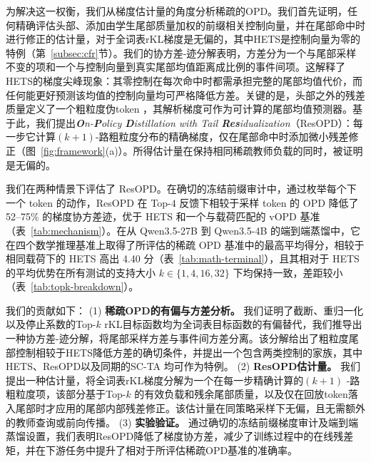 为解决这一权衡，我们从梯度估计量的角度分析稀疏的OPD。我们首先证明，任何精确评估头部、添加由学生尾部质量加权的前缀相关控制向量，并在尾部命中时进行修正的估计量，对于全词表rKL梯度是无偏的，其中HETS是控制向量为零的特例（第~\ref{subsec:cfr}节）。我们的协方差-迹分解表明，方差分为一个与尾部采样不变的项和一个与控制向量到真实尾部均值距离成比例的事件间项。这解释了HETS的梯度尖峰现象：其零控制在每次命中时都需承担完整的尾部均值代价，而任何能更好预测该均值的控制向量均可严格降低方差。关键的是，头部之外的残差质量定义了一个粗粒度伪token \citep{anshumann-etal-2025-sparse,huang2026tail}，其解析梯度可作为可计算的尾部均值预测器。基于此，我们提出\textit{\textbf{O}n-\textbf{P}olicy \textbf{D}istillation with Tail \textbf{Res}idualization}（ResOPD）：每一步它计算$(k+1)$-路粗粒度分布的精确梯度，仅在尾部命中时添加微小残差修正（图~\ref{fig:framework}(a)）。所得估计量在保持相同稀疏教师负载的同时，被证明是无偏的。

我们在两种情景下评估了 ResOPD。在确切的冻结前缀审计中，通过枚举每个下一个 token 的动作，ResOPD 在 Top-$4$ 反馈下相较于采样 token 的 OPD 降低了 52--75\% 的梯度协方差迹，优于 HETS 和一个与载荷匹配的 vOPD 基准（表~\ref{tab:mechanism}）。在从 Qwen3.5-27B 到 Qwen3.5-4B 的端到端蒸馏中，它在四个数学推理基准上取得了所评估的稀疏 OPD 基准中的最高平均得分，相较于相同载荷下的 HETS 高出 4.40 分（表~\ref{tab:math-terminal}），且其相对于 HETS 的平均优势在所有测试的支持大小 $k\in\{1,4,16,32\}$ 下均保持一致，差距较小（表~\ref{tab:topk-breakdown}）。

我们的贡献如下：  
(1) \textbf{稀疏OPD的有偏与方差分析。} 我们证明了截断、重归一化以及停止系数的Top-$k$  rKL目标函数均为全词表目标函数的有偏替代，我们推导出一种协方差-迹分解，将尾部采样方差与事件间方差分离。该分解给出了粗粒度尾部控制相较于HETS降低方差的确切条件，并提出一个包含两类控制的家族，其中HETS、ResOPD以及同期的SC-TA \citep{huang2026tail} 均可作为特例。  
(2) \textbf{ResOPD估计量。} 我们提出一种估计量，将全词表rKL梯度分解为一个在每一步精确计算的$(k+1)$ -路粗粒度项，该部分基于Top-$k$ 的有效负载和残余尾部质量，以及仅在回放token落入尾部时才应用的尾部内部残差修正。该估计量在同策略采样下无偏，且无需额外的教师查询或前向传播。  
(3) \textbf{实验验证。} 通过确切的冻结前缀梯度审计及端到端蒸馏设置，我们表明ResOPD降低了梯度协方差，减少了训练过程中的在线残差矩，并在下游任务中提升了相对于所评估稀疏OPD基准的准确率。
